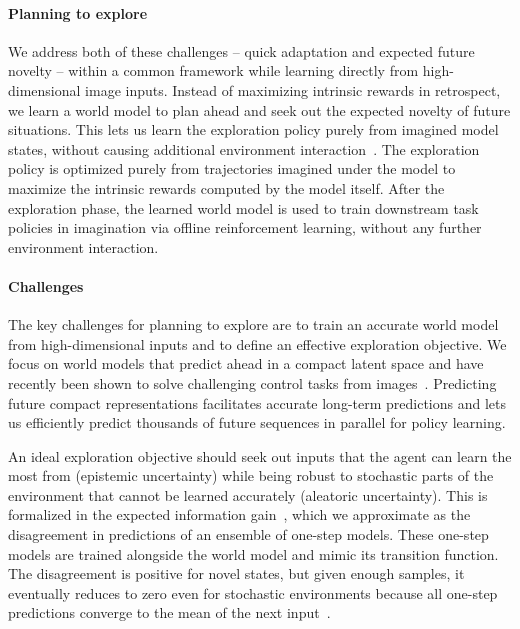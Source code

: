 \documentclass{article}
\begin{document}
\paragraph{Planning to explore}
We address both of these challenges -- quick adaptation and expected future novelty -- within a common framework while learning directly from high-dimensional image inputs. Instead of maximizing intrinsic rewards in retrospect, we learn a world model to plan ahead and seek out the expected novelty of future situations. This lets us learn the exploration policy purely from imagined model states, without causing additional environment interaction~\cite{sun2011planning,shyam2019max}. The exploration policy is optimized purely from trajectories imagined under the model to maximize the intrinsic rewards computed by the model itself. After the exploration phase, the learned world model is used to train downstream task policies in imagination via offline reinforcement learning, without any further environment interaction.

\vspace{-0.09in}
\paragraph{Challenges}
The key challenges for planning to explore are to train an accurate world model from high-dimensional inputs and to define an effective exploration objective. We focus on world models that predict ahead in a compact latent space and have recently been shown to solve challenging control tasks from images~\cite{hafner2018planet,zhang2018solar}. Predicting future compact representations facilitates accurate long-term predictions and lets us efficiently predict thousands of future sequences in parallel for policy learning.

An ideal exploration objective should seek out inputs that the agent can learn the most from (epistemic uncertainty) while being robust to stochastic parts of the environment that cannot be learned accurately (aleatoric uncertainty). This is formalized in the expected information gain~\cite{lindley1956expinfogain}, which we approximate as the disagreement in predictions of an ensemble of one-step models. These one-step models are trained alongside the world model and mimic its transition function. The disagreement is positive for novel states, but given enough samples, it eventually reduces to zero even for stochastic environments because all one-step predictions converge to the mean of the next input~\cite{pathak2019self}.
\end{document}
